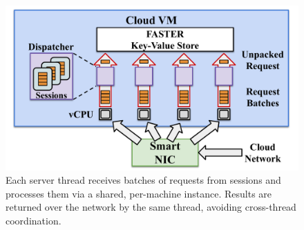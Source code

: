 \begin{figure}[t]
\centering
\includegraphics[width=0.9\columnwidth]{figures/server.pdf}
\caption{Each server thread receives batches of requests from sessions
    and processes them via a shared, per-machine \faster instance.
    Results are returned over the network by the same
    thread, avoiding cross-thread coordination.}
\label{fig:server}
\end{figure}
